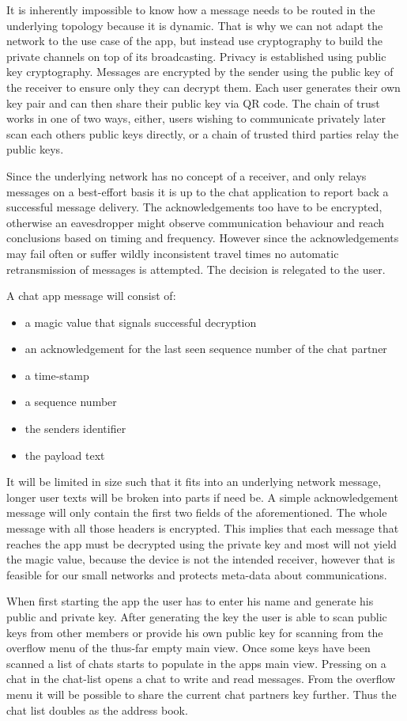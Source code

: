 It is inherently impossible to know how a message needs to be routed in the underlying topology because it is dynamic. That is why we can not adapt the network to the use case of the app, but instead use cryptography to build the private channels on top of its broadcasting. Privacy is established using public key cryptography. Messages are encrypted by the sender using the public key of the receiver to ensure only they can decrypt them. Each user generates their own key pair and can then share their public key via QR code. The chain of trust works in one of two ways, either, users wishing to communicate privately later scan each others public keys directly, or a chain of trusted third parties relay the public keys.

Since the underlying network has no concept of a receiver, and only relays messages on a best-effort basis it is up to the chat application to report back a successful message delivery. The acknowledgements too have to be encrypted, otherwise an eavesdropper might observe communication behaviour and reach conclusions based on timing and frequency. However since the acknowledgements may fail often or suffer wildly inconsistent travel times no automatic retransmission of messages is attempted. The decision is relegated to the user.

A chat app message will consist of:\begin{itemize}
	\item {a magic value that signals successful decryption}
	\item {an acknowledgement for the last seen sequence number of the chat partner}
	\item {a time-stamp}
	\item {a sequence number}
	\item {the senders identifier}
	\item {the payload text}
\end{itemize}
It will be limited in size such that it fits into an underlying network message, longer user texts will be broken into parts if need be. A simple acknowledgement message will only contain the first two fields of the aforementioned. The whole message with all those headers is encrypted. This implies that each message that reaches the app must be decrypted using the private key and most will not yield the magic value, because the device is not the intended receiver, however that is feasible for our small networks and protects meta-data about communications.

When first starting the app the user has to enter his name and generate his public and private key. After generating the key the user is able to scan public keys from other members or provide his own public key for scanning from the overflow menu of the thus-far empty main view. Once some keys have been scanned a list of chats starts to populate in the apps main view. Pressing on a chat in the chat-list opens a chat to write and read messages. From the overflow menu it will be possible to share the current chat partners key further. Thus the chat list doubles as the address book.

